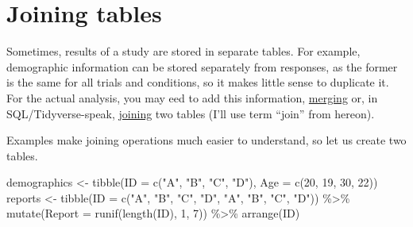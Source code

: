 \documentclass[
]{book}
\newenvironment{Shaded}{\begin{snugshade}}{\end{snugshade}}
\newcommand{\AttributeTok}[1]{\textcolor[rgb]{0.77,0.63,0.00}{#1}}
\newcommand{\DecValTok}[1]{\textcolor[rgb]{0.00,0.00,0.81}{#1}}
\newcommand{\FunctionTok}[1]{\textcolor[rgb]{0.00,0.00,0.00}{#1}}
\newcommand{\NormalTok}[1]{#1}
\newcommand{\OtherTok}[1]{\textcolor[rgb]{0.56,0.35,0.01}{#1}}
\newcommand{\SpecialCharTok}[1]{\textcolor[rgb]{0.00,0.00,0.00}{#1}}
\newcommand{\StringTok}[1]{\textcolor[rgb]{0.31,0.60,0.02}{#1}}
\begin{document}
\hypertarget{joins}{%
\section{Joining tables}\label{joins}}

Sometimes, results of a study are stored in separate tables. For example, demographic information can be stored separately from responses, as the former is the same for all trials and conditions, so it makes little sense to duplicate it. For the actual analysis, you may eed to add this information, \href{https://stat.ethz.ch/R-manual/R-devel/library/base/html/merge.html}{merging} or, in SQL/Tidyverse-speak, \href{https://dplyr.tidyverse.org/reference/mutate-joins.html}{joining} two tables (I'll use term ``join'' from hereon).

Examples make joining operations much easier to understand, so let us create two tables.

\begin{Shaded}
\begin{Highlighting}[]
\NormalTok{demographics }\OtherTok{\textless{}{-}} \FunctionTok{tibble}\NormalTok{(}\AttributeTok{ID =} \FunctionTok{c}\NormalTok{(}\StringTok{"A"}\NormalTok{, }\StringTok{"B"}\NormalTok{, }\StringTok{"C"}\NormalTok{, }\StringTok{"D"}\NormalTok{),}
                       \AttributeTok{Age =} \FunctionTok{c}\NormalTok{(}\DecValTok{20}\NormalTok{, }\DecValTok{19}\NormalTok{, }\DecValTok{30}\NormalTok{, }\DecValTok{22}\NormalTok{))}
\NormalTok{reports }\OtherTok{\textless{}{-}} 
  \FunctionTok{tibble}\NormalTok{(}\AttributeTok{ID =} \FunctionTok{c}\NormalTok{(}\StringTok{"A"}\NormalTok{, }\StringTok{"B"}\NormalTok{, }\StringTok{"C"}\NormalTok{, }\StringTok{"D"}\NormalTok{, }\StringTok{"A"}\NormalTok{, }\StringTok{"B"}\NormalTok{, }\StringTok{"C"}\NormalTok{, }\StringTok{"D"}\NormalTok{)) }\SpecialCharTok{\%\textgreater{}\%}
  \FunctionTok{mutate}\NormalTok{(}\AttributeTok{Report =} \FunctionTok{runif}\NormalTok{(}\FunctionTok{length}\NormalTok{(ID), }\DecValTok{1}\NormalTok{, }\DecValTok{7}\NormalTok{)) }\SpecialCharTok{\%\textgreater{}\%}
  \FunctionTok{arrange}\NormalTok{(ID)}
\end{Highlighting}
\end{Shaded}
\end{document}

